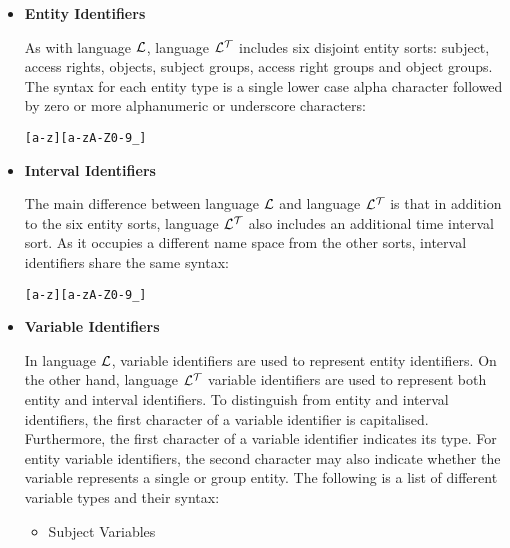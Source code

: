 \documentclass[11pt]{report}
\newenvironment{vverbatim}
{
  \begin{alltt}
}
{
  \vspace{-\baselineskip}
  \end{alltt}
}
\begin{document}
          \begin{itemize}

            \item
              {\bf Entity Identifiers}

              As with language ${\cal L}$, language ${\cal L^T}$ includes six
              disjoint entity sorts: subject, access rights, objects, subject
              groups, access right groups and object groups. The syntax for
              each entity type is a single lower case alpha character followed
              by zero or more alphanumeric or underscore characters:

              \begin{vverbatim}
  [a-z][a-zA-Z0-9\_]
              \end{vverbatim}

            \item
              {\bf Interval Identifiers}

              The main difference between language ${\cal L}$ and language
              ${\cal L^T}$ is that in addition to the six entity sorts, 
              language ${\cal L^T}$ also includes an additional time interval
              sort. As it occupies a different name space from the other sorts,
              interval identifiers share the same syntax:

              \begin{vverbatim}
  [a-z][a-zA-Z0-9\_]
              \end{vverbatim}

            \item
              {\bf Variable Identifiers}

              In language ${\cal L}$, variable identifiers are used to
              represent entity identifiers. On the other hand, language
              ${\cal L^T}$ variable identifiers are used to represent both
              entity and interval identifiers. To distinguish from entity and
              interval identifiers, the first character of a variable
              identifier is capitalised. Furthermore, the first character of
              a variable identifier indicates its type. For entity variable
              identifiers, the second character may also indicate whether the
              variable represents a single or group entity. The following is a
              list of different variable types and their syntax:

              \begin{itemize}
                \item
                  Subject Variables


\end{itemize}
\end{itemize}
\end{document}
